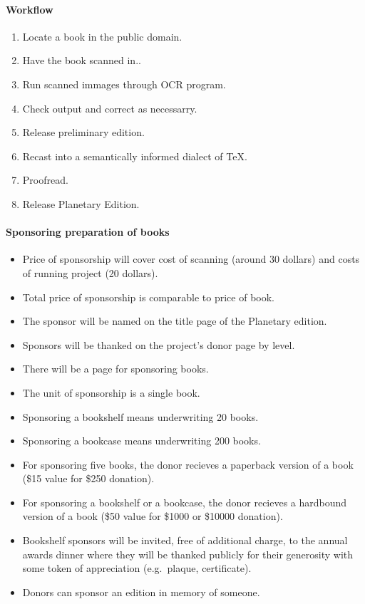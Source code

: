 \begin{itemize}
\paragraph{Workflow}

\begin{enumerate}
\item Locate a book in the public domain. 
\item Have the book scanned in.. 
\item Run scanned immages through OCR program. 
\item Check output and correct as necessarry. 
\item Release preliminary edition. 
\item Recast into a semantically informed dialect of TeX. 
\item Proofread. 
\item Release Planetary Edition.
\end{enumerate}

\paragraph{Sponsoring preparation of books}

\begin{itemize}
\item
  Price of sponsorship will cover cost of scanning (around 30 dollars)
  and costs of running project (20 dollars).
\item
  Total price of sponsorship is comparable to price of book.
\item
  The sponsor will be named on the title page of the Planetary edition.
\item
  Sponsors will be thanked on the project's donor page by level.
\item
  There will be a page for sponsoring books.
\item
  The unit of sponsorship is a single book.
\item
  Sponsoring a bookshelf means underwriting 20 books.
\item
  Sponsoring a bookcase means underwriting 200 books.
\item
  For sponsoring five books, the donor recieves a paperback version of a
  book (\$15 value for \$250 donation).
\item
  For sponsoring a bookshelf or a bookcase, the donor recieves a
  hardbound version of a book (\$50 value for \$1000 or \$10000
  donation).
\item
  Bookshelf sponsors will be invited, free of additional charge, to the
  annual awards dinner where they will be thanked publicly for their
  generosity with some token of appreciation (e.g.~plaque, certificate).
\item
  Donors can sponsor an edition in memory of someone.
\end{itemize}


\end{itemize}
